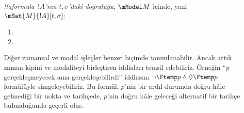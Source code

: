 \begin{defn}
  \emph{!!a{formula}~$!A$'nın $t,\sigma$'daki doğruluğu}, $\mModel M$ içinde,
  yani $\mSat{M}{!A}[t,\sigma]$:
  \begin{enumerate}
  \item{} 
  \item{} 
  \end{enumerate} 
\end{defn}

Diğer zamansal ve modal işleçler benzer biçimde tanımlanabilir. Ancak artık
zaman kipini ve modaliteyi birleştiren iddiaları temsil edebiliriz. Örneğin
``$p$ gerçekleşmeyecek ama gerçekleşebilirdi'' iddiasını
$\lnot\Ftemp p\land\Diamond\Ftemp p$ formülüyle simgeleyebiliriz. Bu formül,
$p$'nin bir ardıl durumda doğru hâle gelmediği bir nokta ve tarihçede,
$p$'nin doğru hâle geleceği alternatif bir tarihçe bulunduğunda geçerli olur.

